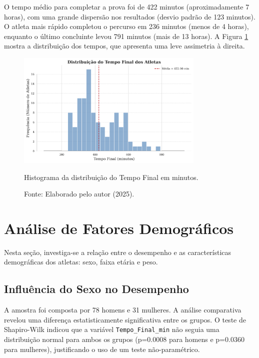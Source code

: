 O tempo médio para completar a prova foi de 422 minutos (aproximadamente 7 horas), com uma grande dispersão nos resultados (desvio padrão de 123 minutos). O atleta mais rápido completou o percurso em 236 minutos (menos de 4 horas), enquanto o último concluinte levou 791 minutos (mais de 13 horas). A Figura \ref{fig:dist_tempo_final} mostra a distribuição dos tempos, que apresenta uma leve assimetria à direita.

\begin{figure}[H]
    \centering
    \includegraphics[width=0.8\textwidth]{Imagens/distribuicao_tempo_final.png}
    \caption{Histograma da distribuição do Tempo Final em minutos.}
    \label{fig:dist_tempo_final}
    \caption*{Fonte: Elaborado pelo autor (2025).}
\end{figure}

\section{Análise de Fatores Demográficos}

Nesta seção, investiga-se a relação entre o desempenho e as características demográficas dos atletas: sexo, faixa etária e peso.

\subsection{Influência do Sexo no Desempenho}

A amostra foi composta por 78 homens e 31 mulheres. A análise comparativa revelou uma diferença estatisticamente significativa entre os grupos. O teste de Shapiro-Wilk indicou que a variável \texttt{Tempo\_Final\_min} não seguia uma distribuição normal para ambos os grupos (p=0.0008 para homens e p=0.0360 para mulheres), justificando o uso de um teste não-paramétrico.

